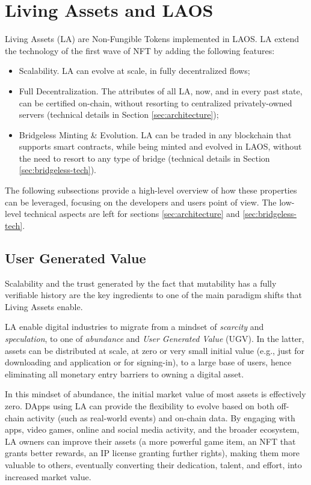 \section{Living Assets and LAOS}\label{living-assets}

Living Assets (LA) are Non-Fungible Tokens implemented in LAOS. 
LA extend the technology of the first wave of NFT by adding the
following features:
\begin{itemize}
    \item Scalability. LA can evolve at scale, in fully decentralized flows;
    \item Full Decentralization. The attributes of all LA, now, and in every past state, can be certified on-chain, without 
    resorting to centralized privately-owned servers (technical details in Section \ref{sec:architecture});
    \item Bridgeless Minting \& Evolution. LA can be traded in any blockchain that supports smart contracts,
    while being minted and evolved in LAOS, without the need to resort to any type of bridge
    (technical details in Section \ref{sec:bridgeless-tech}).
\end{itemize}

The following subsections provide a high-level overview of how these 
properties can be leveraged, focusing on the developers and users
point of view. The low-level technical
aspects are left for sections \ref{sec:architecture} and  \ref{sec:bridgeless-tech}.

\subsection{User Generated Value}\label{sec:ugv}

Scalability and the trust generated by the fact that 
mutability has a fully verifiable history are the key ingredients 
to one of the main paradigm shifts that Living Assets enable.

LA enable digital industries to migrate from a mindset of {\it scarcity} and {\it speculation},
to one of {\it abundance} and {\it User Generated Value} (UGV). In the latter, 
assets can be distributed at scale, at zero or very small initial value
(e.g., just for downloading and application or for signing-in), to a large base of users, hence 
eliminating all monetary entry barriers to owning a digital asset.

In this mindset of abundance, the initial market value of most assets is effectively zero.
DApps using LA can provide the flexibility to evolve based on both
off-chain activity (such as real-world events) and on-chain data.
By engaging with apps, video games,
online and social media activity, and the broader ecosystem,
LA owners can improve their assets (a more powerful game item,
an NFT that grants better rewards, an IP license granting further rights),
making them more valuable to others,
eventually converting their dedication, talent, and effort,
into increased market value.

